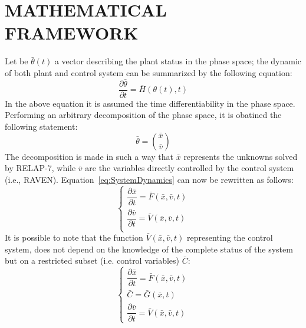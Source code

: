 \documentclass{anstrans}
\begin{document}
\section{MATHEMATICAL FRAMEWORK}
\label{sec:mathFramework}
Let be $\bar{\theta}(t)$ a vector describing the plant status in the phase space; the dynamic of both plant and control system can be summarized by the following equation:
\begin{equation}
\frac{\partial \bar{\theta}}{\partial t} = \bar{H}(\theta(t),t)
\label{eq:SystemDynamics}
\end{equation}
In the above equation it is assumed the time differentiability in the phase space. Performing an arbitrary decomposition of the phase space, it is obatined the following statement:
\begin{equation}
\bar{\theta}=\binom{\bar{x}}{\bar{v}}
\label{eq:firstDecomposition}
\end{equation}
The decomposition is made in such a way that $\bar{x}$ represents the unknowns solved by RELAP-7, while $\bar{v}$ are the variables directly controlled by the control system (i.e., RAVEN). Equation~\ref{eq:SystemDynamics} can now be rewritten as follows:
\begin{equation}
\begin{cases} 
\dfrac{\partial \bar{x}}{\partial t} = \bar{F}(\bar{x},\bar{v},t) \\ 
\dfrac{\partial \bar{v}}{\partial t} = \bar{V}(\bar{x},\bar{v},t) \\
\end{cases}
\label{eq:generalSystemEquation}
\end{equation}
It is possible to note that the function $\bar{V}(\bar{x},\bar{v},t)$ representing the control system, does not depend on the knowledge of the complete status of the system but on a restricted subset (i.e. control variables) $\bar{C}$:
\begin{equation}
\begin{cases} 
\dfrac{\partial \bar{x}}{\partial t} = \bar{F}(\bar{x},\bar{v},t) \\
\bar{C} = \bar{G}(\bar{x},t) \\ 
\dfrac{\partial \bar{v}}{\partial t} = \bar{V}(\bar{x},\bar{v},t) 
\end{cases}
\label{eq:generalSystemEquationwithControl}
\end{equation}
\end{document}

